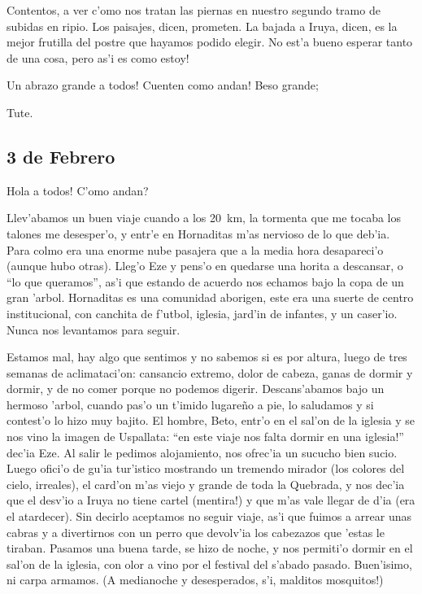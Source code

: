 Contentos, a ver c'omo nos tratan las piernas en nuestro segundo tramo de
subidas en ripio. Los paisajes, dicen, prometen. La bajada a Iruya, dicen, es la
mejor frutilla del postre que hayamos podido elegir. \textexclamdown No est'a
bueno esperar tanto de una cosa, pero as'i es como estoy!

\textexclamdown Un abrazo grande a todos! \textexclamdown Cuenten como andan!
Beso grande;

Tute.

\subsection*{3 de Febrero}

\textexclamdown Hola a todos! \textquestiondown C'omo andan?

Llev'abamos un buen viaje cuando a los 20~km, la tormenta que me tocaba los
talones me desesper'o, y entr'e en Hornaditas m'as nervioso de lo que deb'ia.
Para colmo era una enorme nube pasajera que a la media hora desapareci'o (aunque
hubo otras). Lleg'o Eze y pens'o en quedarse una horita a descansar, o ``lo que
queramos'', as'i que estando de acuerdo nos echamos bajo la copa de un gran
'arbol. Hornaditas es una comunidad aborigen, este era una suerte de centro
institucional, con canchita de f'utbol, iglesia, jard'in de infantes, y un
caser'io. Nunca nos levantamos para seguir.

Estamos mal, hay algo que sentimos y no sabemos si es por altura, luego de tres
semanas de aclimataci'on: cansancio extremo, dolor de cabeza, ganas de dormir y
dormir, y de no comer porque no podemos digerir. Descans'abamos bajo un hermoso
'arbol, cuando pas'o un t'imido lugare\~no a pie, lo saludamos y si contest'o lo
hizo muy bajito. El hombre, Beto, entr'o en el sal'on de la iglesia y se nos
vino la imagen de Uspallata: ``\textexclamdown en este viaje nos falta dormir en una iglesia!''
dec'ia Eze. Al salir le pedimos alojamiento, nos ofrec'ia un sucucho bien sucio.
Luego ofici'o de gu'ia tur'istico mostrando un tremendo mirador (los colores del
cielo, irreales), el card'on m'as viejo y grande de toda la Quebrada, y nos
dec'ia que el desv'io a Iruya no tiene cartel (\textexclamdown mentira!) y que
m'as vale llegar de d'ia (era el atardecer). Sin decirlo aceptamos no
seguir viaje, as'i que fuimos a arrear unas cabras y a divertirnos con un perro
que devolv'ia los cabezazos que 'estas le tiraban. Pasamos una buena tarde, se
hizo de noche, y nos permiti'o dormir en el sal'on de la iglesia, con olor a
vino por el festival del s'abado pasado. Buen'isimo, ni carpa armamos. (A
medianoche y desesperados, s'i, \textexclamdown malditos mosquitos!)

